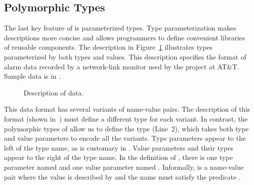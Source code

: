 

\subsection{Polymorphic Types}

The last key feature of \padsml{} is parameterized types.  Type
parameterization makes descriptions more concise and allows
programmers to define convenient libraries of reusable components. The
description in Figure~\ref{fig:darkstar-ml} illustrates types
parameterized by both types and values.  This description specifies
the format of alarm data recorded by a network-link monitor used by
the \darkstar{} project at AT\&T.  Sample \darkstar{} data is in
.


\begin{figure}
  \centering
  
  \caption{Description of \darkstar{} data.}
  \label{fig:darkstar-ml}
\end{figure}

This data format has several variants of name-value pairs. The
\padsc{} description of this format (shown in~)
must define a different type for each variant. In contrast, the
polymorphic types of \padsml{} allow us to define the type 
(Line~2), which takes both type and value parameters to encode all the
variants. Type parameters appear to the left of the type name, as is
customary in \ml{}.  Value parameters and their \ml{} types appear to
the right of the type name.  In the definition of , there is
one type parameter named  and one value parameter named
.  Informally,  is a name-value pair where the
value is described by  and the name must satisfy the
predicate .

